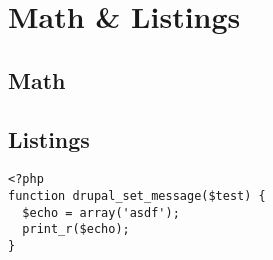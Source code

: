 \section{Math \& Listings}

\subsection{Math}

\subsection{Listings}

\begin{lstlisting}
<?php
function drupal_set_message($test) {
  $echo = array('asdf');
  print_r($echo);
}
\end{lstlisting}
